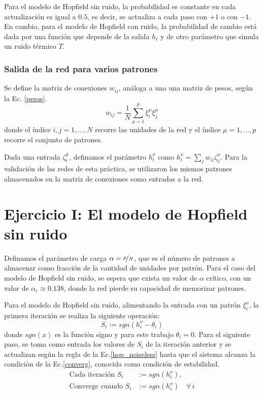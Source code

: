 Para el modelo de Hopfield sin ruido, la probabilidad es constante en cada actualización es igual a $0.5$, es decir, se actualiza a cada paso con $+1$ o con $-1$. En cambio, para el modelo de Hopfield con ruido, la probabilidad de cambio está dada por una función que depende de la salida $h_i$ y de otro parámetro que simula un ruido térmico $T$.

\subsubsection*{Salida de la red  para varios patrones}

Se define la matriz de conexiones $w_{ij}$, análoga a una una matriz de pesos, según la Ec. \ref{pesos}.
\begin{equation}
	w_{ij} = \frac{1}{N} \sum _{\mu=1} ^{p}\xi_i^\mu \xi_j^\mu 
	\label{pesos}
\end{equation}
donde el índice $i, j= 1, \dots , N$ recorre las unidades de la red y el índice $\mu= 1, \dots, p$ recorre el conjunto de patrones.

Dada una entrada $\zeta ^\mu_i$, definamos el parámetro $h^\nu_i $ como $h^\nu_i = \sum_j w_{ij} \zeta_j ^\nu$. Para la validación de las redes de esta práctica, se utilizaron los mismos patrones almacenados en la matriz de conexiones como entradas a la red. 

\section*{Ejercicio I: El modelo de Hopfield sin ruido}

Definamos el parámetro de carga $\alpha  = \nicefrac{p}{N}$, que es el número de patrones a almacenar como fracción de la cantidad de unidades por patrón.  Para el caso del modelo de Hopfield sin ruido, se espera que exista un valor de $\alpha$ crítico, con un valor de  $\alpha_c \approx 0.138$, donde la red pierde su capacidad de memorizar patrones.

Para el modelo de Hopfield sin ruido, alimentando la entrada con un patrón $\xi_i^\nu$, la primera iteración se realiza la siguiente operación:
\begin{equation}
	S_i := sgn(h^\nu _i- \theta_i)
\end{equation}
donde $sgn(x)$ es la función signo y para este trabajo $\theta_i = 0$. Para el siguiente paso, se toma como entrada los valores de $S_i$ de la iteración anterior y se actualizan según la regla de la Ec.\ref{hop_noiseless} hasta que el sistema alcanza la condición de la Ec.\ref{converg}, conocida como condición de estabilidad.
\begin{align}
	\text{Cada iteraci\'on }S_i &:= sgn(h^\nu _i), \label{hop_noiseless}\\	
	\text{Converge cuando }S_i &:= sgn(h^\nu _i) \quad \forall \,i \label{converg}
\end{align}


